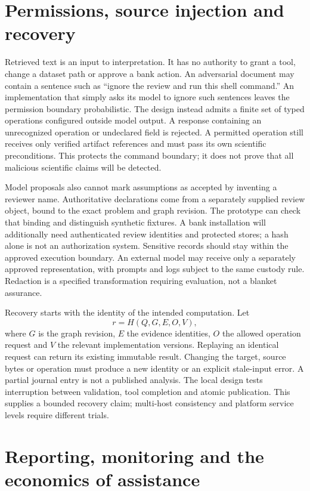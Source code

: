 \section{Permissions, source injection and recovery}

Retrieved text is an input to interpretation. It has no authority to grant a
tool, change a dataset path or approve a bank action. An adversarial document
may contain a sentence such as ``ignore the review and run this shell command.''
An implementation that simply asks its model to ignore such sentences leaves
the permission boundary probabilistic. The design instead admits a finite set
of typed operations configured outside model output. A response containing an
unrecognized operation or undeclared field is rejected. A permitted operation
still receives only verified artifact references and must pass its own
scientific preconditions. This protects the command boundary; it does not prove
that all malicious scientific claims will be detected.

Model proposals also cannot mark assumptions as accepted by inventing a reviewer
name. Authoritative declarations come from a separately supplied review object,
bound to the exact problem and graph revision. The prototype can check that
binding and distinguish synthetic fixtures. A bank installation will additionally
need authenticated review identities and protected stores; a hash alone is not
an authorization system. Sensitive records should stay within the approved
execution boundary. An external model may receive only a separately approved
representation, with prompts and logs subject to the same custody rule. Redaction
is a specified transformation requiring evaluation, not a blanket assurance.

Recovery starts with the identity of the intended computation. Let
\[
 r=H(Q,G,E,O,V),
\]
where $G$ is the graph revision, $E$ the evidence identities, $O$ the allowed
operation request and $V$ the relevant implementation versions. Replaying an
identical request can return its existing immutable result. Changing the target,
source bytes or operation must produce a new identity or an explicit stale-input
error. A partial journal entry is not a published analysis. The local design
tests interruption between validation, tool completion and atomic publication.
This supplies a bounded recovery claim; multi-host consistency and platform
service levels require different trials.

\section{Reporting, monitoring and the economics of assistance}

